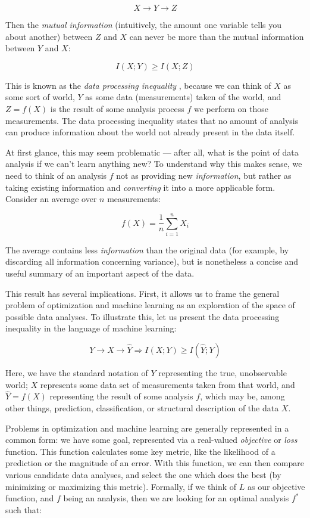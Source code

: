 \[
X \rightarrow Y \rightarrow Z
\]

Then the \textit{mutual information} (intuitively, the amount one variable tells you about another) between $Z$ and $X$ can never be more than the mutual information between $Y$ and $X$:

\[
I(X; Y) \geq I(X; Z)
\]

This is known as the \textit{data processing inequality} \citep{cover}, because we can think of $X$ as some sort of  world, $Y$ as some data (measurements) taken of the world, and $Z = f(X)$ is the result of some analysis process $f$ we perform on those measurements.
The data processing inequality states that no amount of analysis can produce information about the world not already present in the data itself.

At first glance, this may seem problematic --- after all, what is the point of data analysis if we can't learn anything new?
To understand why this makes sense, we need to think of an analysis $f$ not as providing new \textit{information}, but rather as taking existing information and \textit{converting} it into a more applicable form.
Consider an average over $n$ measurements:

\[
f(X) = \frac{1}{n} \sum_{i=1}^n X_i
\]

The average contains less \textit{information} than the original data (for example, by discarding all information concerning variance), but is nonetheless a concise and useful summary of an important aspect of the data.

\bigskip

This result has several implications.
First, it allows us to frame the general problem of optimization and machine learning as an exploration of the space of possible data analyses.
To illustrate this, let us present the data processing inequality in the language of machine learning:

\[
Y \rightarrow X \rightarrow \hat{Y} \Rightarrow I(X; Y) \geq I(\hat{Y}; Y)
\]

Here, we have the standard notation of $Y$ representing the true, unobservable world; $X$ represents some data set of measurements taken from that world, and $\hat{Y} = f(X)$ representing the result of some analysis $f$, which may be, among other things, prediction, classification, or structural description of the data $X$.

Problems in optimization and machine learning are generally represented in a common form: we have some goal, represented via a real-valued \textit{objective} or \textit{loss} function.
This function calculates some key metric, like the likelihood of a prediction or the magnitude of an error.
With this function, we can then compare various candidate data analyses, and select the one which does the best (by minimizing or maximizing this metric).
Formally, if we think of $L$ as our objective function, and $f$ being an analysis, then we are looking for an optimal analysis $f^*$ such that:

